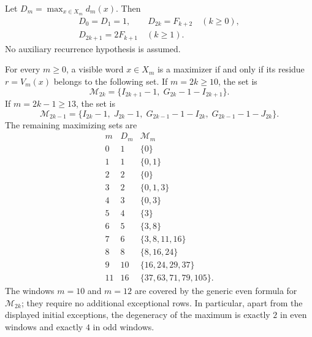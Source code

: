\begin{theorem}
\label{thm:unconditional-extremal-fibers}
Let \(D_m=\max_{x\in X_m}d_m(x)\).  Then
\[
 \begin{gathered}
 D_0=D_1=1,\qquad D_{2k}=F_{k+2}\quad(k\ge0),\\
 D_{2k+1}=2F_{k+1}\quad(k\ge1).
 \end{gathered}
\]
No auxiliary recurrence hypothesis is assumed.

For every \(m\ge0\), a visible word \(x\in X_m\) is a maximizer if and only if
its residue \(r=V_m(x)\) belongs to the following set.  If \(m=2k\ge10\), the
set is
\[
 \mathcal M_{2k}
 =\{I_{2k+1}-1,\;G_{2k}-1-I_{2k+1}\}.
\]
If \(m=2k-1\ge13\), the set is
\[
 \mathcal M_{2k-1}
 =\{I_{2k}-1,\;J_{2k}-1,\;
       G_{2k-1}-1-I_{2k},\;G_{2k-1}-1-J_{2k}\}.
\]
The remaining maximizing sets are
\[
\begin{array}{c|c|l}
m&D_m&\mathcal M_m\\ \hline
0&1&\{0\}\\
1&1&\{0,1\}\\
2&2&\{0\}\\
3&2&\{0,1,3\}\\
4&3&\{0,3\}\\
5&4&\{3\}\\
6&5&\{3,8\}\\
7&6&\{3,8,11,16\}\\
8&8&\{8,16,24\}\\
9&10&\{16,24,29,37\}\\
11&16&\{37,63,71,79,105\}.
\end{array}
\]
The windows \(m=10\) and \(m=12\) are covered by the generic even formula
for \(\mathcal M_{2k}\); they require no additional exceptional rows.
In particular, apart from the displayed initial exceptions, the degeneracy of
the maximum is exactly \(2\) in even windows and exactly \(4\) in odd windows.
\end{theorem}

